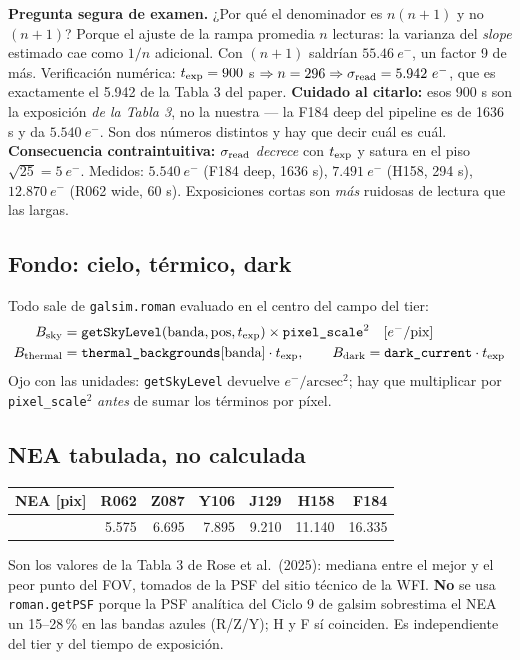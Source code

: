 \documentclass[11pt,a4paper]{article}
\newcommand{\code}[1]{\texttt{\small #1}}
\newcommand{\eminus}{e^{-}}
\newlength{\examenpad}
\newenvironment{examen}
  {\par\medskip\noindent
   \begin{lrbox}{\examenbox}%
   \begin{minipage}{\dimexpr\linewidth-2\examenpad}\small}
  {\end{minipage}%
   \end{lrbox}%
   {\setlength{\fboxsep}{\examenpad}\colorbox{boxgray}{\usebox{\examenbox}}}%
   \par\medskip}
\begin{document}
\begin{examen}
\textbf{Pregunta segura de examen.} ¿Por qué el denominador es $n(n+1)$ y no $(n+1)$? Porque el
ajuste de la rampa promedia $n$ lecturas: la varianza del \emph{slope} estimado cae como $1/n$
adicional. Con $(n+1)$ saldrían $55.46\ \eminus$, un factor 9 de más. Verificación numérica:
$t_{\rm exp}=900$ s $\Rightarrow n=296 \Rightarrow \sigma_{\rm read}=5.942\ \eminus$, que es
exactamente el 5.942 de la Tabla 3 del paper. \textbf{Cuidado al citarlo:} esos 900 s son la
exposición \emph{de la Tabla 3}, no la nuestra --- la F184 deep del pipeline es de 1636 s y da
$5.540\ \eminus$. Son dos números distintos y hay que decir cuál es cuál.\\[2pt]
\textbf{Consecuencia contraintuitiva:} $\sigma_{\rm read}$ \emph{decrece} con $t_{\rm exp}$ y satura
en el piso $\sqrt{25}=5\ \eminus$. Medidos: $5.540\ \eminus$ (F184 deep, 1636 s), $7.491\ \eminus$
(H158, 294 s), $12.870\ \eminus$ (R062 wide, 60 s). Exposiciones cortas son \emph{más} ruidosas de
lectura que las largas.
\end{examen}

\subsection{Fondo: cielo, térmico, dark}
Todo sale de \code{galsim.roman} evaluado en el centro del campo del tier:
\begin{align}
B_{\rm sky} &= \texttt{getSkyLevel}(\text{banda}, \text{pos}, t_{\rm exp}) \times \texttt{pixel\_scale}^2
  \quad [\eminus/\text{pix}] \\
B_{\rm thermal} &= \texttt{thermal\_backgrounds}[\text{banda}]\cdot t_{\rm exp}, \qquad
B_{\rm dark} = \texttt{dark\_current}\cdot t_{\rm exp}
\end{align}
Ojo con las unidades: \code{getSkyLevel} devuelve $\eminus/\text{arcsec}^2$; hay que multiplicar por
\code{pixel\_scale}$^2$ \emph{antes} de sumar los términos por píxel.

\subsection{NEA tabulada, no calculada}
\label{sec:nea}
\begin{center}
\begin{tabular}{lrrrrrr}
\toprule
NEA [pix] & R062 & Z087 & Y106 & J129 & H158 & F184 \\
\midrule
 & 5.575 & 6.695 & 7.895 & 9.210 & 11.140 & 16.335 \\
\bottomrule
\end{tabular}
\end{center}
Son los valores de la Tabla 3 de Rose et al.\ (2025): mediana entre el mejor y el peor punto del
FOV, tomados de la PSF del sitio técnico de la WFI. \textbf{No} se usa \code{roman.getPSF} porque
la PSF analítica del Ciclo 9 de galsim sobrestima el NEA un 15--28\,\% en las bandas azules (R/Z/Y);
H y F sí coinciden. Es independiente del tier y del tiempo de exposición.
\end{document}
